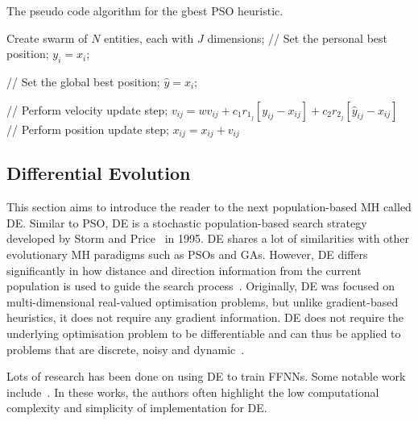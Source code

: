 \begin{algorithm}[H]
      \caption{The pseudo code algorithm for the gbest \acs{PSO} heuristic.}
      \label{algo:heuristics:pso:gbest}
      \begin{algorithmic}
            \State Create swarm of $N$ entities, each with $J$ dimensions;
            \State // Set the personal best position;
            \State $y_{i} = x_{i}$;
            \EndIf

            \State // Set the global best position;
            \State $\hat{y} = x_{i}$;
            \EndIf
            \EndFor

            \State // Perform velocity update step;
            \State $v_{ij} = wv_{ij} + c_{1}r_{1_{j}}[y_{ij} - x_{ij}] + c_{2}r_{2_{j}}[\hat{y}_{ij} - x_{ij}]$
            \State // Perform position update step;
            \State $x_{ij} = x_{ij} + v_{ij}$
            \EndFor
            \EndFor
            \EndWhile
      \end{algorithmic}
\end{algorithm}

\subsection{Differential Evolution}\label{sec:heuristics:mh:de}

This section aims to introduce the reader to the next population-based \acs{MH} called \acf{DE}. Similar to \acs{PSO}, \acs{DE} is a stochastic population-based search strategy developed by Storm and Price~\cite{ref:price:2006} in 1995. \Ac{DE} shares a lot of similarities with other evolutionary \acs{MH} paradigms such as \acp{PSO} and \acp{GA}. However, \acs{DE} differs significantly in how distance and direction information from the current population is used to guide the search process~\cite{ref:engelbrecht:2007}. Originally, \acs{DE} was focused on multi-dimensional real-valued optimisation problems, but unlike gradient-based heuristics, it does not require any gradient information. \acs{DE} does not require the underlying optimisation problem to be differentiable and can thus be applied to problems that are discrete, noisy and dynamic~\cite{ref:rocca:2011}.

Lots of research has been done on using \acs{DE} to train \acp{FFNN}. Some notable work include~\cite{ref:ilonen:2003, ref:slowik:2008, ref:mingguang:2009}. In these works, the authors often highlight the low computational complexity and simplicity of implementation for \acs{DE}.

